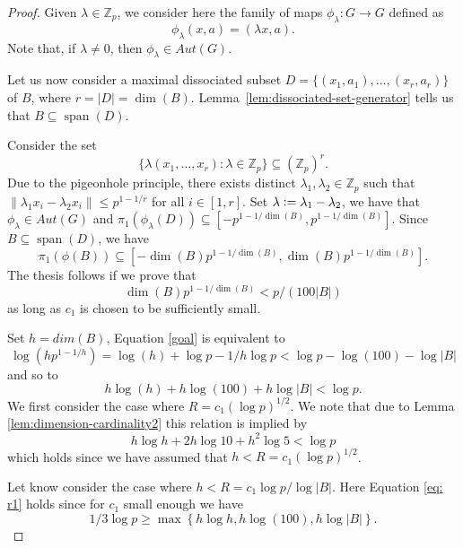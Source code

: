 \documentclass[10pt,a4paper]{amsart}
\DeclareMathOperator{\Span}{span}
\begin{document}
\begin{proof}
Given $\lambda\in \mathbb{Z}_p$, we consider here the family of maps $\phi_{\lambda}: G\rightarrow G$
defined as
$$ \phi_{\lambda}(x,a)=(\lambda x,a).$$
Note that, if $\lambda\not=0$, then $\phi_{\lambda}\in Aut(G)$.

Let us now consider a maximal dissociated subset $D=\{(x_1,a_1),\dots,(x_r,a_r)\}$ of $B$, where $r=|D|= \dim(B)$. Lemma~\ref{lem:dissociated-set-generator} tells us that $B\subseteq \Span(D)$.

Consider the set
$$\{\lambda(x_1,\dots,x_r): \lambda \in \mathbb{Z}_p\} \subseteq (\mathbb{Z}_p)^{r}.$$
Due to the pigeonhole principle, there exists distinct $\lambda_1, \lambda_2 \in \mathbb{Z}_p$ such that $\|\lambda_1 x_i -\lambda_2 x_i\| \leq p^{1-1/r}$ for all $i\in [1,r]$.  Set $\lambda\vcentcolon=\lambda_1-\lambda_2$, we have that $\phi_\lambda\in Aut(G)$ and $\pi_1(\phi_\lambda(D))\subseteq  [-p^{1-1/\dim(B)},p^{1-1/\dim(B)}]$.
Since $B\subseteq \Span(D)$, we have
$$\pi_1(\phi(B)) \subseteq [-\dim(B)p^{1-1/\dim(B)},\dim(B)p^{1-1/\dim(B)}].$$
The thesis follows if we prove that 
\begin{equation}\label{goal}
\dim(B)p^{1-1/\dim(B)}<p/(100|B|)
\end{equation} 
as long as $c_1$ is chosen to be sufficiently small.

Set $h=dim(B)$, Equation \eqref{goal} is equivalent to
$$\log({h p^{1-1/h}})=\log(h)+\log{p}-1/h\log{p}<\log{p}-\log(100)-\log{|B|}$$
and so to
\begin{equation}\label{eq: r1}
    h \log(h) + h \log(100) + h\log|B| < \log p.
\end{equation}
We first consider the case where $R = c_1 (\log p)^{1/2}$. We note that due to Lemma \ref{lem:dimension-cardinality2} this relation is implied by
$$h\log{h}+2h\log{10}+h^2\log{5}<\log{p}
$$
which holds since we have assumed that $h < R = c_1 (\log p)^{1/2}$.

Let know consider the case where $h < R = c_1 \log p / \log |B|$. Here Equation \eqref{eq: r1} holds since for $c_1$ small enough we have
$$1/3 \log p \geq \max \left\{ h \log h, h \log (100), h \log |B| \right\}.$$
\end{proof}
\end{document}
